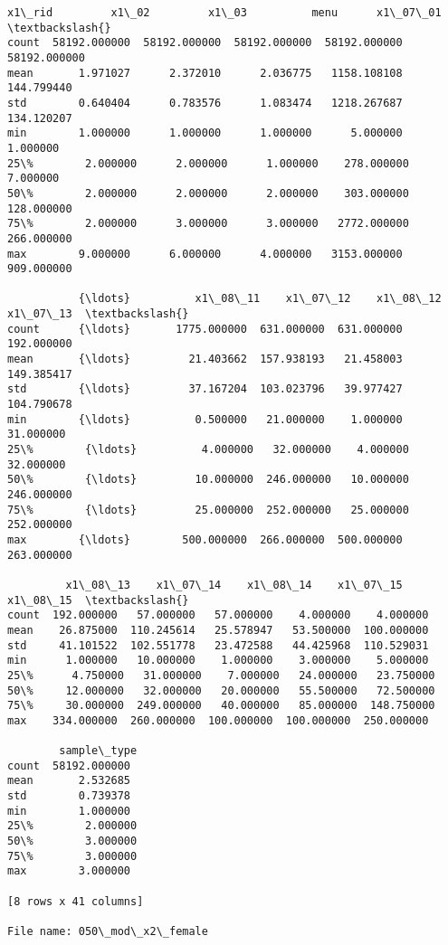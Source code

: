 \documentclass[11pt]{article}
\begin{document}
\begin{Verbatim}[commandchars=\\\{\}]
             x1\_rid         x1\_02         x1\_03          menu      x1\_07\_01  \textbackslash{}
count  58192.000000  58192.000000  58192.000000  58192.000000  58192.000000   
mean       1.971027      2.372010      2.036775   1158.108108    144.799440   
std        0.640404      0.783576      1.083474   1218.267687    134.120207   
min        1.000000      1.000000      1.000000      5.000000      1.000000   
25\%        2.000000      2.000000      1.000000    278.000000      7.000000   
50\%        2.000000      2.000000      2.000000    303.000000    128.000000   
75\%        2.000000      3.000000      3.000000   2772.000000    266.000000   
max        9.000000      6.000000      4.000000   3153.000000    909.000000   

           {\ldots}          x1\_08\_11    x1\_07\_12    x1\_08\_12    x1\_07\_13  \textbackslash{}
count      {\ldots}       1775.000000  631.000000  631.000000  192.000000   
mean       {\ldots}         21.403662  157.938193   21.458003  149.385417   
std        {\ldots}         37.167204  103.023796   39.977427  104.790678   
min        {\ldots}          0.500000   21.000000    1.000000   31.000000   
25\%        {\ldots}          4.000000   32.000000    4.000000   32.000000   
50\%        {\ldots}         10.000000  246.000000   10.000000  246.000000   
75\%        {\ldots}         25.000000  252.000000   25.000000  252.000000   
max        {\ldots}        500.000000  266.000000  500.000000  263.000000   

         x1\_08\_13    x1\_07\_14    x1\_08\_14    x1\_07\_15    x1\_08\_15  \textbackslash{}
count  192.000000   57.000000   57.000000    4.000000    4.000000   
mean    26.875000  110.245614   25.578947   53.500000  100.000000   
std     41.101522  102.551778   23.472588   44.425968  110.529031   
min      1.000000   10.000000    1.000000    3.000000    5.000000   
25\%      4.750000   31.000000    7.000000   24.000000   23.750000   
50\%     12.000000   32.000000   20.000000   55.500000   72.500000   
75\%     30.000000  249.000000   40.000000   85.000000  148.750000   
max    334.000000  260.000000  100.000000  100.000000  250.000000   

        sample\_type  
count  58192.000000  
mean       2.532685  
std        0.739378  
min        1.000000  
25\%        2.000000  
50\%        3.000000  
75\%        3.000000  
max        3.000000  

[8 rows x 41 columns]

File name: 050\_mod\_x2\_female


\end{Verbatim}
\end{document}
